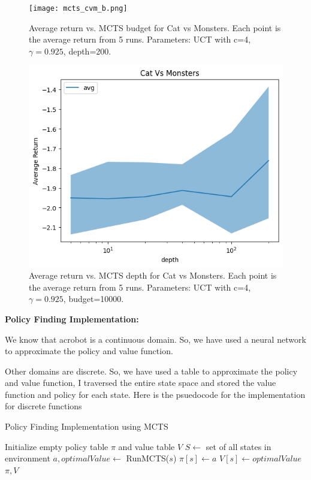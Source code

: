 \documentclass{article}
\begin{document}
\begin{figure}[!hb]
    \centering
    \begin{minipage}{0.48\textwidth}
        \centering
        \texttt{[image: mcts\_cvm\_b.png]}
        \caption{Average return vs. MCTS budget for Cat vs Monsters. Each point is the average return from 5 runs. Parameters: UCT with c=4, $\gamma=0.925$, depth=200.}
        \label{fig:4.4.1}
    \end{minipage}
    \hfill
    \begin{minipage}{0.48\textwidth}
        \centering
        \includegraphics[width=\linewidth]{mcts_cvm_d.png}
        \caption{Average return vs. MCTS depth for Cat vs Monsters. Each point is the average return from 5 runs. Parameters: UCT with c=4, $\gamma=0.925$, budget=10000.}
        \label{fig:4.4.2}
    \end{minipage}
\end{figure}


\textbf{Policy Finding Implementation:}

We know that acrobot is a continuous domain. So, we have used a neural network to approximate the policy and value function.

Other domains are discrete. So, we have used a table to approximate the policy and value function, 
I traversed the entire state space and stored the value function and policy for each state. Here is the psuedocode for the implementation for discrete functions

\begin{algorithm}[H]
\caption{Policy Finding Implementation using MCTS}
\begin{algorithmic}[1]
\State Initialize empty policy table $\pi$ and value table $V$
\State $S \gets$ set of all states in environment
    \State $a, optimalValue \gets$ RunMCTS($s$) 
    \State $\pi[s] \gets a$ 
    \State $V[s] \gets optimalValue$ 
\EndFor
\State \Return $\pi, V$  
\end{algorithmic}
\end{algorithm}
\end{document}
